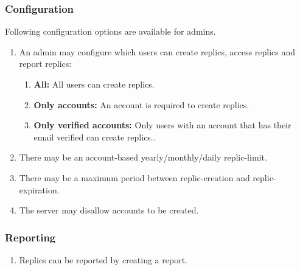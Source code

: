 \subsubsection{Configuration}
Following configuration options are available for admins.
\begin{enumerate}[label=\textit{AC \arabic*}, resume]
    \item \label{ac:config:1} An admin may configure which users can create replics, access replics and report replics: \begin{enumerate}
                                                                                              \item \textbf{All:} All users can create replics.
                                                                                              \item \textbf{Only accounts:} An account is required to create replics.
                                                                                              \item \textbf{Only verified accounts:} Only users with an account that has their email verified can create replics..
    \end{enumerate}
    \item \label{ac:config:2} There may be an account-based yearly/monthly/daily replic-limit.
    \item \label{ac:config:3} There may be a maximum period between replic-creation and replic-expiration.
    \item \label{ac:config:4} The server may disallow accounts to be created.
\end{enumerate}

\subsubsection{Reporting}
\begin{enumerate}[label=\textit{AC \arabic*}, resume]
    \item \label{ac:reports:1} Replics can be reported by creating a report.
\end{enumerate}

